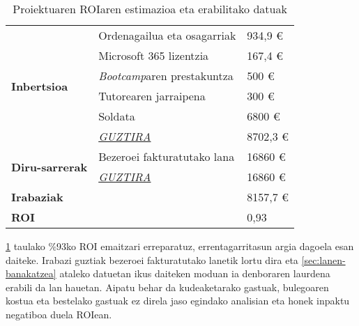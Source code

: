 \begin{table}[H]
\centering
\def\arraystretch{1.5}
\begin{tabular}{lll}
\hline
\multirow{6}{*}{\textbf{Inbertsioa}} & \cellcolor{teal!10}Ordenagailua eta osagarriak & \cellcolor{teal!10}934,9 €   \\
                            & Microsoft 365 lizentzia     & 167,4 €   \\
                            & \cellcolor{teal!10}\textit{Bootcamp}aren prestakuntza & \cellcolor{teal!10}500 €     \\
                            & Tutorearen jarraipena       & 300 €     \\
                            & \cellcolor{teal!10}Soldata & \cellcolor{teal!10}6800 €    \\ \cline{2-3} 
                            & \underline{\textit{GUZTIRA}}           & 8702,3 €  \\
\hline
\multirow{2}{*}{\textbf{Diru-sarrerak}}  & \cellcolor{teal!10}Bezeroei fakturatutako lana & \cellcolor{teal!10}16860 €   \\ \cline{2-3}     
                            & \underline{\textit{GUZTIRA}}               & 16860 €   \\
\hline
\multicolumn{2}{l}{\textbf{Irabaziak}}& 8157,7 € \\  
\hline
\multicolumn{2}{l}{\cellcolor{teal!25}\textbf{ROI}}& \cellcolor{teal!35}0,93 \\  
\hline
\end{tabular}
\caption{Proiektuaren ROIaren estimazioa eta erabilitako datuak}
\label{roi-table}
\end{table}

\ref{roi-table} taulako \%93ko ROI emaitzari erreparatuz, errentagarritasun argia dagoela esan daiteke.
Irabazi guztiak bezeroei fakturatutako lanetik lortu dira eta \ref{sec:lanen-banakatzea} ataleko datuetan ikus daiteken moduan ia denboraren laurdena erabili da lan hauetan.
Aipatu behar da kudeaketarako gastuak, bulegoaren kostua eta bestelako gastuak ez direla jaso egindako analisian eta honek inpaktu negatiboa duela ROIean. 

